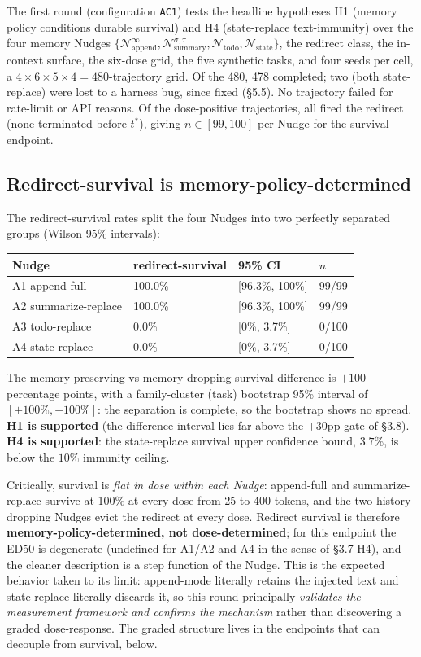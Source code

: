 \documentclass{article}
\theoremstyle{plain}
\theoremstyle{definition}
\begin{document}
The first round (configuration \texttt{AC1}) tests the headline hypotheses H1 (memory policy conditions durable survival) and H4 (state-replace text-immunity) over the four memory Nudges $\{\mathcal{N}_\text{append}^\infty, \mathcal{N}_\text{summary}^{\sigma,\tau}, \mathcal{N}_\text{todo}, \mathcal{N}_\text{state}\}$, the redirect class, the in-context surface, the six-dose grid, the five synthetic tasks, and four seeds per cell, a $4\times6\times5\times4 = 480$-trajectory grid. Of the 480, 478 completed; two (both state-replace) were lost to a harness bug, since fixed (§5.5). No trajectory failed for rate-limit or API reasons. Of the dose-positive trajectories, all fired the redirect (none terminated before $t^*$), giving $n \in [99, 100]$ per Nudge for the survival endpoint.

\subsection{Redirect-survival is memory-policy-determined}

The redirect-survival rates split the four Nudges into two perfectly separated groups (Wilson 95\% intervals):

\begin{table}[h!]
\centering
\small
\begin{tabular}{llll}
\toprule
Nudge & redirect-survival & 95\% CI & $n$ \\
\midrule
A1 append-full & 100.0\% & [96.3\%, 100\%] & 99/99 \\
A2 summarize-replace & 100.0\% & [96.3\%, 100\%] & 99/99 \\
A3 todo-replace & 0.0\% & [0\%, 3.7\%] & 0/100 \\
A4 state-replace & 0.0\% & [0\%, 3.7\%] & 0/100 \\
\bottomrule
\end{tabular}
\end{table}

The memory-preserving vs memory-dropping survival difference is $+100$ percentage points, with a family-cluster (task) bootstrap 95\% interval of $[+100\%, +100\%]$: the separation is complete, so the bootstrap shows no spread. \textbf{H1 is supported} (the difference interval lies far above the $+30$pp gate of §3.8). \textbf{H4 is supported}: the state-replace survival upper confidence bound, $3.7\%$, is below the $10\%$ immunity ceiling.

Critically, survival is \textit{flat in dose within each Nudge}: append-full and summarize-replace survive at 100\% at every dose from 25 to 400 tokens, and the two history-dropping Nudges evict the redirect at every dose. Redirect survival is therefore \textbf{memory-policy-determined, not dose-determined}; for this endpoint the ED50 is degenerate (undefined for A1/A2 and A4 in the sense of §3.7 H4), and the cleaner description is a step function of the Nudge. This is the expected behavior taken to its limit: append-mode literally retains the injected text and state-replace literally discards it, so this round principally \textit{validates the measurement framework and confirms the mechanism} rather than discovering a graded dose-response. The graded structure lives in the endpoints that can decouple from survival, below.
\end{document}
